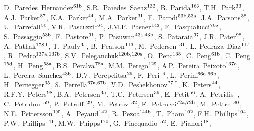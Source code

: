 \begin{flushleft}
D.~Paredes~Hernandez$^\textrm{\scriptsize 61b}$,    
S.R.~Paredes~Saenz$^\textrm{\scriptsize 132}$,    
B.~Parida$^\textrm{\scriptsize 163}$,    
T.H.~Park$^\textrm{\scriptsize 33}$,    
A.J.~Parker$^\textrm{\scriptsize 87}$,    
K.A.~Parker$^\textrm{\scriptsize 44}$,    
M.A.~Parker$^\textrm{\scriptsize 31}$,    
F.~Parodi$^\textrm{\scriptsize 53b,53a}$,    
J.A.~Parsons$^\textrm{\scriptsize 38}$,    
U.~Parzefall$^\textrm{\scriptsize 50}$,    
V.R.~Pascuzzi$^\textrm{\scriptsize 164}$,    
J.M.P.~Pasner$^\textrm{\scriptsize 143}$,    
E.~Pasqualucci$^\textrm{\scriptsize 70a}$,    
S.~Passaggio$^\textrm{\scriptsize 53b}$,    
F.~Pastore$^\textrm{\scriptsize 91}$,    
P.~Pasuwan$^\textrm{\scriptsize 43a,43b}$,    
S.~Pataraia$^\textrm{\scriptsize 97}$,    
J.R.~Pater$^\textrm{\scriptsize 98}$,    
A.~Pathak$^\textrm{\scriptsize 178,l}$,    
T.~Pauly$^\textrm{\scriptsize 35}$,    
B.~Pearson$^\textrm{\scriptsize 113}$,    
M.~Pedersen$^\textrm{\scriptsize 131}$,    
L.~Pedraza~Diaz$^\textrm{\scriptsize 117}$,    
R.~Pedro$^\textrm{\scriptsize 137a,137b}$,    
S.V.~Peleganchuk$^\textrm{\scriptsize 120b,120a}$,    
O.~Penc$^\textrm{\scriptsize 138}$,    
C.~Peng$^\textrm{\scriptsize 61b}$,    
C.~Peng$^\textrm{\scriptsize 15d}$,    
H.~Peng$^\textrm{\scriptsize 58a}$,    
B.S.~Peralva$^\textrm{\scriptsize 78a}$,    
M.M.~Perego$^\textrm{\scriptsize 129}$,    
A.P.~Pereira~Peixoto$^\textrm{\scriptsize 137a}$,    
L.~Pereira~Sanchez$^\textrm{\scriptsize 43b}$,    
D.V.~Perepelitsa$^\textrm{\scriptsize 29}$,    
F.~Peri$^\textrm{\scriptsize 19}$,    
L.~Perini$^\textrm{\scriptsize 66a,66b}$,    
H.~Pernegger$^\textrm{\scriptsize 35}$,    
S.~Perrella$^\textrm{\scriptsize 67a,67b}$,    
V.D.~Peshekhonov$^\textrm{\scriptsize 77,*}$,    
K.~Peters$^\textrm{\scriptsize 44}$,    
R.F.Y.~Peters$^\textrm{\scriptsize 98}$,    
B.A.~Petersen$^\textrm{\scriptsize 35}$,    
T.C.~Petersen$^\textrm{\scriptsize 39}$,    
E.~Petit$^\textrm{\scriptsize 56}$,    
A.~Petridis$^\textrm{\scriptsize 1}$,    
C.~Petridou$^\textrm{\scriptsize 159}$,    
P.~Petroff$^\textrm{\scriptsize 129}$,    
M.~Petrov$^\textrm{\scriptsize 132}$,    
F.~Petrucci$^\textrm{\scriptsize 72a,72b}$,    
M.~Pettee$^\textrm{\scriptsize 180}$,    
N.E.~Pettersson$^\textrm{\scriptsize 100}$,    
A.~Peyaud$^\textrm{\scriptsize 142}$,    
R.~Pezoa$^\textrm{\scriptsize 144b}$,    
T.~Pham$^\textrm{\scriptsize 102}$,    
F.H.~Phillips$^\textrm{\scriptsize 104}$,    
P.W.~Phillips$^\textrm{\scriptsize 141}$,    
M.W.~Phipps$^\textrm{\scriptsize 170}$,    
G.~Piacquadio$^\textrm{\scriptsize 152}$,    
E.~Pianori$^\textrm{\scriptsize 18}$,    

\end{flushleft}
